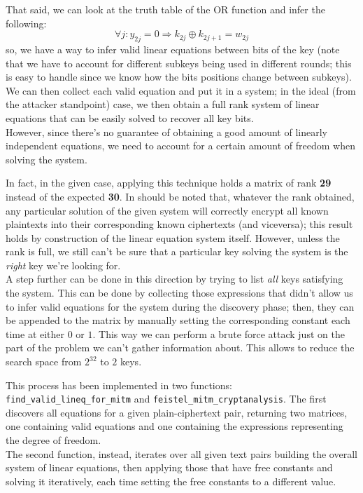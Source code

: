 \documentclass[a4paper,12pt,titlepage]{article}
\begin{document}
That said, we can look at the truth table of the OR function and infer the
following:
\[\forall j : y_{2j} = 0 \Rightarrow k_{2j} \oplus k_{2j+1} = w_{2j}\]
so, we have a way to infer valid linear equations between bits of the key (note
that we have to account for different subkeys being used in different rounds;
this is easy to handle since we know how the bits positions change between
subkeys). \\
We can then collect each valid equation and put it in a system; in the ideal (from
the attacker standpoint) case, we then obtain a full rank system of linear
equations that can be easily solved to recover all key bits. \\
However, since there's no guarantee of obtaining a good amount of linearly
independent equations, we need to account for a certain amount of freedom when
solving the system.

In fact, in the given case, applying this technique holds a matrix of rank
\textbf{29} instead of the expected \textbf{30}. In should be noted that,
whatever the rank obtained, any particular solution of the given system will
correctly encrypt all known plaintexts into their corresponding known
ciphertexts (and viceversa); this result holds by construction of the linear
equation system itself. However, unless the rank is full, we still can't be sure
that a particular key solving the system is the \emph{right} key we're looking
for. \\

A step further can be done in this direction by trying to list \emph{all} keys
satisfying the system. This can be done by
collecting those expressions that didn't allow us to infer valid equations for
the system during the discovery phase; then, they can be appended to the matrix by
manually setting the corresponding constant each time at either $0$ or $1$.
This way we can perform a brute force attack just on the part of the problem we
can't gather information about. This allows to reduce the search space from
$2^{32}$ to $2$ keys.

This process has been implemented in two functions:
\texttt{find\_valid\_lineq\_for\_mitm} and \texttt{feistel\_mitm\_cryptanalysis}. The
first discovers all equations for a given plain-ciphertext pair, returning two
matrices, one containing valid equations and one containing the expressions
representing the degree of freedom. \\
The second function, instead, iterates over all given text pairs building the
overall system of linear equations, then applying those that have free
constants and solving it iteratively, each time setting the free constants to a
different value.
\end{document}
